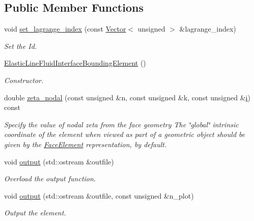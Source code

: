 \subsection*{Public Member Functions}
\begin{DoxyCompactItemize}
\item 
void \hyperlink{classoomph_1_1ElasticLineFluidInterfaceBoundingElement_a524b359509676cd429729e0dde59da92}{set\+\_\+lagrange\+\_\+index} (const \hyperlink{classoomph_1_1Vector}{Vector}$<$ unsigned $>$ \&lagrange\+\_\+index)
\begin{DoxyCompactList}\small\item\em Set the Id. \end{DoxyCompactList}\item 
\hyperlink{classoomph_1_1ElasticLineFluidInterfaceBoundingElement_ad531b7e5debaecc74d64755c82bbc17d}{Elastic\+Line\+Fluid\+Interface\+Bounding\+Element} ()
\begin{DoxyCompactList}\small\item\em Constructor. \end{DoxyCompactList}\item 
double \hyperlink{classoomph_1_1ElasticLineFluidInterfaceBoundingElement_a1d8a7213d7bd2826bc59af770f66f402}{zeta\+\_\+nodal} (const unsigned \&n, const unsigned \&k, const unsigned \&\hyperlink{cfortran_8h_adb50e893b86b3e55e751a42eab3cba82}{i}) const
\begin{DoxyCompactList}\small\item\em Specify the value of nodal zeta from the face geometry The \char`\"{}global\char`\"{} intrinsic coordinate of the element when viewed as part of a geometric object should be given by the \hyperlink{classoomph_1_1FaceElement}{Face\+Element} representation, by default. \end{DoxyCompactList}\item 
void \hyperlink{classoomph_1_1ElasticLineFluidInterfaceBoundingElement_a50444fef924185e8d462238045e24543}{output} (std\+::ostream \&outfile)
\begin{DoxyCompactList}\small\item\em Overload the output function. \end{DoxyCompactList}\item 
void \hyperlink{classoomph_1_1ElasticLineFluidInterfaceBoundingElement_a7a0df1419f28df0351ed1c5e05f8f751}{output} (std\+::ostream \&outfile, const unsigned \&n\+\_\+plot)
\begin{DoxyCompactList}\small\item\em Output the element. \end{DoxyCompactList}\item 

\end{DoxyCompactItemize}
